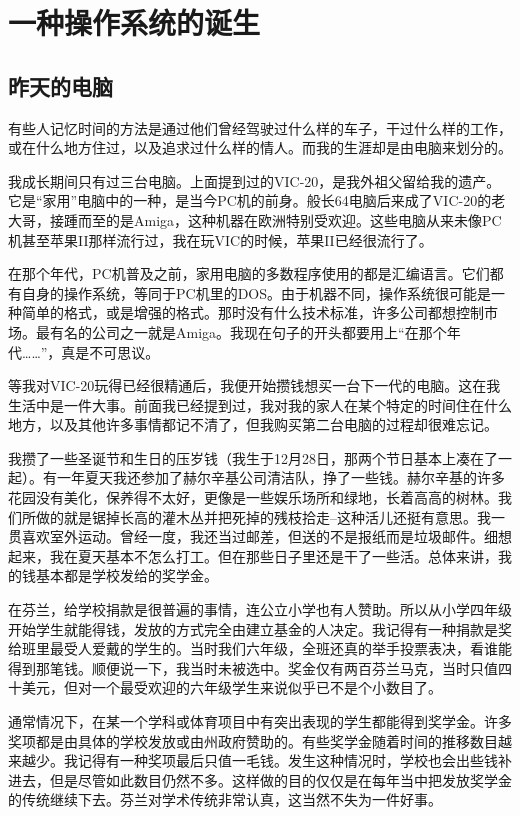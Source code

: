 \chapter{一种操作系统的诞生}
\section{昨天的电脑}

有些人记忆时间的方法是通过他们曾经驾驶过什么样的车子，干过什么样的工作，或在什么地方住过，以及追求过什么样的情人。而我的生涯却是由电脑来划分的。

我成长期间只有过三台电脑。上面提到过的VIC-20，是我外祖父留给我的遗产。它是“家用”电脑中的一种，是当今PC机的前身。般长64电脑后来成了VIC-20的老大哥，接踵而至的是Amiga，这种机器在欧洲特别受欢迎。这些电脑从来未像PC机甚至苹果II那样流行过，我在玩VIC的时候，苹果II已经很流行了。

在那个年代，PC机普及之前，家用电脑的多数程序使用的都是汇编语言。它们都有自身的操作系统，等同于PC机里的DOS。由于机器不同，操作系统很可能是一种简单的格式，或是增强的格式。那时没有什么技术标准，许多公司都想控制市场。最有名的公司之一就是Amiga。我现在句子的开头都要用上“在那个年代……”，真是不可思议。

等我对VIC-20玩得已经很精通后，我便开始攒钱想买一台下一代的电脑。这在我生活中是一件大事。前面我已经提到过，我对我的家人在某个特定的时间住在什么地方，以及其他许多事情都记不清了，但我购买第二台电脑的过程却很难忘记。

我攒了一些圣诞节和生日的压岁钱（我生于12月28日，那两个节日基本上凑在了一起）。有一年夏天我还参加了赫尔辛基公司清洁队，挣了一些钱。赫尔辛基的许多花园没有美化，保养得不太好，更像是一些娱乐场所和绿地，长着高高的树林。我们所做的就是锯掉长高的灌木丛并把死掉的残枝拾走--这种活儿还挺有意思。我一贯喜欢室外运动。曾经一度，我还当过邮差，但送的不是报纸而是垃圾邮件。细想起来，我在夏天基本不怎么打工。但在那些日子里还是干了一些活。总体来讲，我的钱基本都是学校发给的奖学金。

在芬兰，给学校捐款是很普遍的事情，连公立小学也有人赞助。所以从小学四年级开始学生就能得钱，发放的方式完全由建立基金的人决定。我记得有一种捐款是奖给班里最受人爱戴的学生的。当时我们六年级，全班还真的举手投票表决，看谁能得到那笔钱。顺便说一下，我当时未被选中。奖金仅有两百芬兰马克，当时只值四十美元，但对一个最受欢迎的六年级学生来说似乎已不是个小数目了。

通常情况下，在某一个学科或体育项目中有突出表现的学生都能得到奖学金。许多奖项都是由具体的学校发放或由州政府赞助的。有些奖学金随着时间的推移数目越来越少。我记得有一种奖项最后只值一毛钱。发生这种情况时，学校也会出些钱补进去，但是尽管如此数目仍然不多。这样做的目的仅仅是在每年当中把发放奖学金的传统继续下去。芬兰对学术传统非常认真，这当然不失为一件好事。


